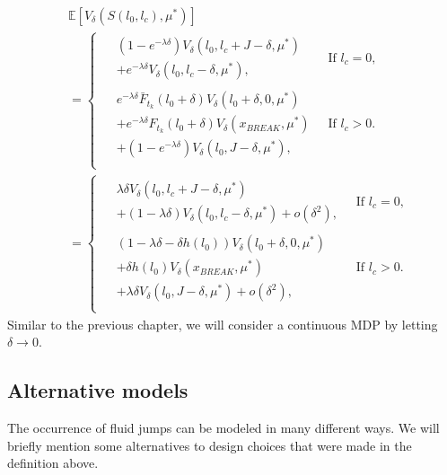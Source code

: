 \documentclass[a4paper]{thesis}
\theoremstyle{definition}
\begin{document}
\begin{equation}\label{eq:SimpleFluidNextState}
\begin{split}
&\mathbb{E}[V_\delta(S(l_0,l_c),\mu^*)]\\
&=\begin{cases}
\begin{split}
&(1-e^{-\lambda \delta})V_\delta(l_0,l_c+J-\delta,\mu^*)\\
&+e^{-\lambda \delta}V_\delta(l_0,l_c-\delta,\mu^*),
\end{split}&\ \text{If $l_c=0$,}\\
\begin{split}
&e^{-\lambda \delta} \bar{F}_{t_k}(l_0+\delta)V_\delta(l_0+\delta,0,\mu^*)\\
&+ e^{-\lambda \delta}F_{t_k}(l_0+\delta)V_\delta(x_{BREAK},\mu^*)\\
&+(1-e^{-\lambda \delta})V_\delta(l_0,J-\delta,\mu^*),
\end{split}&\ \text{If $l_c>0$.}\\
\end{cases}\\
&=\begin{cases}
\begin{split}
&\lambda\delta V_\delta(l_0,l_c+J-\delta,\mu^*)\\
&+(1-\lambda \delta)V_\delta(l_0,l_c-\delta,\mu^*)+o(\delta^2),
\end{split}
&\ \text{If $l_c=0$,}\\
\begin{split}
&(1-\lambda \delta-\delta h(l_0))V_\delta(l_0+\delta,0,\mu^*)\\
&+ \delta h(l_0)V_\delta(x_{BREAK},\mu^*)\\
&+\lambda \delta V_\delta(l_0,J-\delta,\mu^*)+o(\delta^2),
\end{split}&\ \text{If $l_c>0$.}\\
\end{cases}
\end{split}
\end{equation}
Similar to the previous chapter, we will consider a continuous MDP by letting $\delta\rightarrow0$.

\subsection{Alternative models}
The occurrence of fluid jumps can be modeled in many different ways.
We will briefly mention some alternatives to design choices that were made in the definition above.
\end{document}

